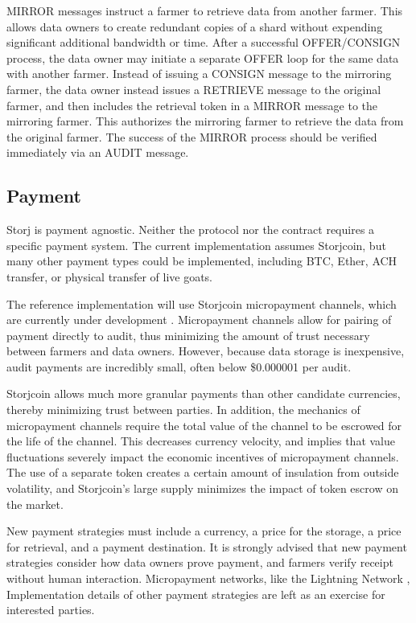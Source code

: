 \documentclass[a4paper,10pt]{article}
\begin{document}
MIRROR messages instruct a farmer to retrieve data from another farmer. This allows data owners to create redundant copies of a shard without expending significant additional bandwidth or time. After a successful OFFER/CONSIGN process, the data owner may initiate a separate OFFER loop for the same data with another farmer. Instead of issuing a CONSIGN message to the mirroring farmer, the data owner instead issues a RETRIEVE message to the original farmer, and then includes the retrieval token in a MIRROR message to the mirroring farmer. This authorizes the mirroring farmer to retrieve the data from the original farmer. The success of the MIRROR process should be verified immediately via an AUDIT message.

\subsection{Payment}
Storj is payment agnostic. Neither the protocol nor the contract requires a specific payment system. The current implementation assumes Storjcoin, but many other payment types could be implemented, including BTC, Ether, ACH transfer, or physical transfer of live goats.

The reference implementation will use Storjcoin micropayment channels, which are currently under development \cite{26}. Micropayment channels allow for pairing of payment directly to audit, thus minimizing the amount of trust necessary between farmers and data owners. However, because data storage is inexpensive, audit payments are incredibly small, often below \$0.000001 per audit.

Storjcoin allows much more granular payments than other candidate currencies, thereby minimizing trust between parties. In addition, the mechanics of micropayment channels require the total value of the channel to be escrowed for the life of the channel. This decreases currency velocity, and implies that value fluctuations severely impact the economic incentives of micropayment channels. The use of a separate token creates a certain amount of insulation from outside volatility, and Storjcoin's large supply minimizes the impact of token escrow on the market.

New payment strategies must include a currency, a price for the storage, a price for retrieval, and a payment destination. It is strongly advised that new payment strategies consider how data owners prove payment, and farmers verify receipt without human interaction. Micropayment networks, like the Lightning Network \cite{25}, Implementation details of other payment strategies are left as an exercise for interested parties.
\end{document}
